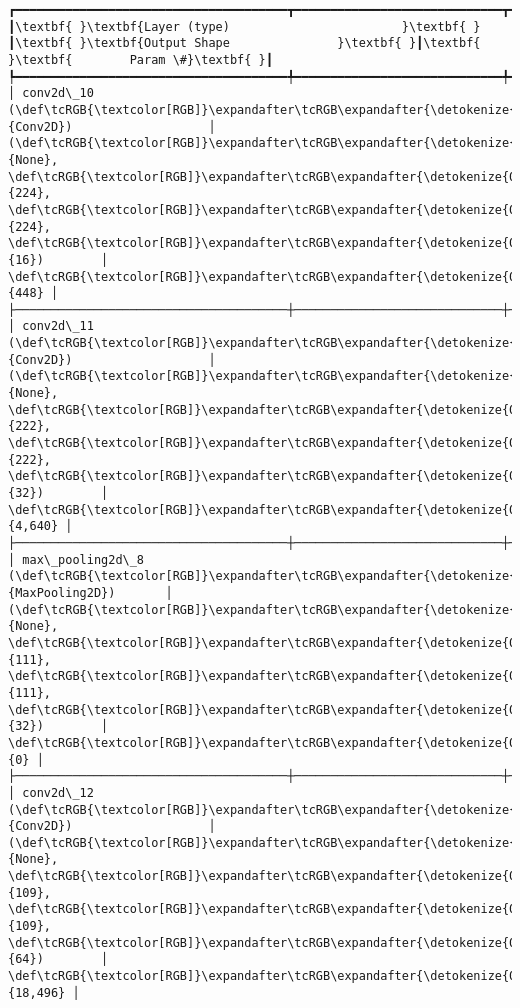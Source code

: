 \documentclass[11pt]{article}
\begin{document}
    \begin{Verbatim}[commandchars=\\\{\}]
┏━━━━━━━━━━━━━━━━━━━━━━━━━━━━━━━━━━━━━━┳━━━━━━━━━━━━━━━━━━━━━━━━━━━━━┳━━━━━━━━━━━━━━━━━┓
┃\textbf{ }\textbf{Layer (type)                        }\textbf{ }┃\textbf{ }\textbf{Output Shape               }\textbf{ }┃\textbf{ }\textbf{        Param \#}\textbf{ }┃
┡━━━━━━━━━━━━━━━━━━━━━━━━━━━━━━━━━━━━━━╇━━━━━━━━━━━━━━━━━━━━━━━━━━━━━╇━━━━━━━━━━━━━━━━━┩
│ conv2d\_10 (\def\tcRGB{\textcolor[RGB]}\expandafter\tcRGB\expandafter{\detokenize{0,135,255}}{Conv2D})                   │ (\def\tcRGB{\textcolor[RGB]}\expandafter\tcRGB\expandafter{\detokenize{0,215,255}}{None}, \def\tcRGB{\textcolor[RGB]}\expandafter\tcRGB\expandafter{\detokenize{0,175,0}}{224}, \def\tcRGB{\textcolor[RGB]}\expandafter\tcRGB\expandafter{\detokenize{0,175,0}}{224}, \def\tcRGB{\textcolor[RGB]}\expandafter\tcRGB\expandafter{\detokenize{0,175,0}}{16})        │             \def\tcRGB{\textcolor[RGB]}\expandafter\tcRGB\expandafter{\detokenize{0,175,0}}{448} │
├──────────────────────────────────────┼─────────────────────────────┼─────────────────┤
│ conv2d\_11 (\def\tcRGB{\textcolor[RGB]}\expandafter\tcRGB\expandafter{\detokenize{0,135,255}}{Conv2D})                   │ (\def\tcRGB{\textcolor[RGB]}\expandafter\tcRGB\expandafter{\detokenize{0,215,255}}{None}, \def\tcRGB{\textcolor[RGB]}\expandafter\tcRGB\expandafter{\detokenize{0,175,0}}{222}, \def\tcRGB{\textcolor[RGB]}\expandafter\tcRGB\expandafter{\detokenize{0,175,0}}{222}, \def\tcRGB{\textcolor[RGB]}\expandafter\tcRGB\expandafter{\detokenize{0,175,0}}{32})        │           \def\tcRGB{\textcolor[RGB]}\expandafter\tcRGB\expandafter{\detokenize{0,175,0}}{4,640} │
├──────────────────────────────────────┼─────────────────────────────┼─────────────────┤
│ max\_pooling2d\_8 (\def\tcRGB{\textcolor[RGB]}\expandafter\tcRGB\expandafter{\detokenize{0,135,255}}{MaxPooling2D})       │ (\def\tcRGB{\textcolor[RGB]}\expandafter\tcRGB\expandafter{\detokenize{0,215,255}}{None}, \def\tcRGB{\textcolor[RGB]}\expandafter\tcRGB\expandafter{\detokenize{0,175,0}}{111}, \def\tcRGB{\textcolor[RGB]}\expandafter\tcRGB\expandafter{\detokenize{0,175,0}}{111}, \def\tcRGB{\textcolor[RGB]}\expandafter\tcRGB\expandafter{\detokenize{0,175,0}}{32})        │               \def\tcRGB{\textcolor[RGB]}\expandafter\tcRGB\expandafter{\detokenize{0,175,0}}{0} │
├──────────────────────────────────────┼─────────────────────────────┼─────────────────┤
│ conv2d\_12 (\def\tcRGB{\textcolor[RGB]}\expandafter\tcRGB\expandafter{\detokenize{0,135,255}}{Conv2D})                   │ (\def\tcRGB{\textcolor[RGB]}\expandafter\tcRGB\expandafter{\detokenize{0,215,255}}{None}, \def\tcRGB{\textcolor[RGB]}\expandafter\tcRGB\expandafter{\detokenize{0,175,0}}{109}, \def\tcRGB{\textcolor[RGB]}\expandafter\tcRGB\expandafter{\detokenize{0,175,0}}{109}, \def\tcRGB{\textcolor[RGB]}\expandafter\tcRGB\expandafter{\detokenize{0,175,0}}{64})        │          \def\tcRGB{\textcolor[RGB]}\expandafter\tcRGB\expandafter{\detokenize{0,175,0}}{18,496} │

\end{Verbatim}
\end{document}

